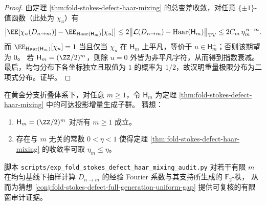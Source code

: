 \begin{proof}
由定理 \ref{thm:fold-stokes-defect-haar-mixing} 的总变差收敛，对任意 \(\{\pm1\}\)-值函数（此处为 \(\chi_u\)）有
\[
\bigl|\EE[\chi_u(D_{n\to m})]-\EE_{\mathrm{Haar}(\mathsf H_m)}[\chi_u]\bigr|
\le 2\bigl\|\mathcal L(D_{n\to m})-\mathrm{Haar}(\mathsf H_m)\bigr\|_{\mathrm{TV}}
\le 2C_m\,\eta_m^{\,n-m}.
\]
而 \(\EE_{\mathrm{Haar}(\mathsf H_m)}[\chi_u]=1\) 当且仅当 \(\chi_u\) 在 \(\mathsf H_m\) 上平凡，等价于 \(u\in\mathsf H_m^\perp\)；否则该期望为 \(0\)。
若 \(\mathsf H_m=(\ZZ/2)^m\)，则除 \(u=0\) 外皆为非平凡字符，从而得到指数衰减。
最后，均匀分布下各坐标独立且取值为 \(1\) 的概率为 \(1/2\)，故汉明重量极限分布为二项式分布。证毕。
\end{proof}

\begin{conjecture}[黄金分支折叠缺陷的全生成性与统一谱隙]\label{conj:fold-stokes-defect-full-generation-uniform-gap}
在黄金分支折叠体系下，对任意 \(m\ge 1\)，令 \(\mathsf H_m\) 为定理 \ref{thm:fold-stokes-defect-haar-mixing} 中的可达投影增量生成子群。
猜想：
\begin{enumerate}
  \item \(\mathsf H_m=(\ZZ/2)^m\) 对所有 \(m\ge 1\) 成立。
  \item 存在与 \(m\) 无关的常数 \(0<\eta<1\) 使得定理 \ref{thm:fold-stokes-defect-haar-mixing} 的收敛率可取 \(\eta_m\le \eta\)。
\end{enumerate}
\end{conjecture}

\begin{remark}[可审计核验接口]\label{rem:fold-stokes-defect-haar-mixing-audit-script}
脚本 \texttt{scripts/exp\_fold\_stokes\_defect\_haar\_mixing\_audit.py} 对若干有限 \(m\) 在均匀基线下抽样计算 \(D_{n\to m}\) 的经验 Fourier 系数与其支持所生成的 \(\mathbb{F}_2\)-秩，
从而为猜想 \ref{conj:fold-stokes-defect-full-generation-uniform-gap} 提供可复核的有限窗审计证据。
\end{remark}

